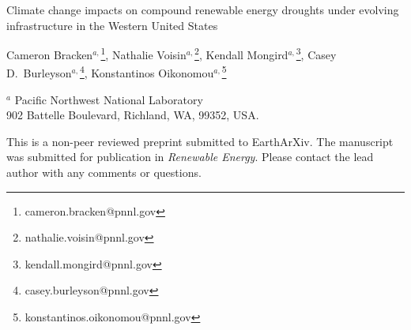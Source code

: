 \documentclass[a4paper]{article}
\begin{document}

\Large
 \begin{center}
Climate change impacts on compound renewable energy droughts under evolving infrastructure in the Western United States\\ 

\hspace{10pt}

\large
Cameron Bracken$^{a,}$\footnote{cameron.bracken@pnnl.gov}, 
Nathalie Voisin$^{a,}$\footnote{nathalie.voisin@pnnl.gov}, 
Kendall Mongird$^{a,}$\footnote{kendall.mongird@pnnl.gov},
Casey D.\ Burleyson$^{a,}$\footnote{casey.burleyson@pnnl.gov}, 
Konstantinos Oikonomou$^{a,}$\footnote{konstantinos.oikonomou@pnnl.gov}\\

\hspace{10pt}

\small  
$^a$ Pacific Northwest National Laboratory\\
902 Battelle Boulevard, Richland, WA, 99352, USA. 

\end{center}

\normalsize 

This is a non-peer reviewed preprint submitted to EarthArXiv. The manuscript was submitted for publication in \textit{Renewable Energy}. Please contact the lead author with any comments or questions. 
\end{document}
